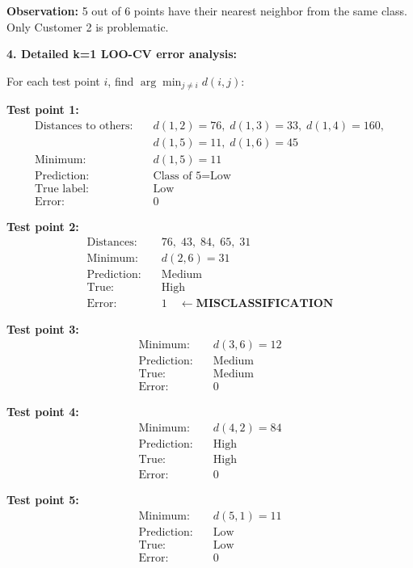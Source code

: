 \documentclass[12pt]{article}
\begin{document}
\begin{computation}
\textbf{Observation:} 5 out of 6 points have their nearest neighbor from the same class. Only Customer 2 is problematic.

\textbf{4. Detailed k=1 LOO-CV error analysis:}

For each test point \(i\), find \(\arg\min_{j \neq i} d(i,j)\):

\textbf{Test point 1:}
\begin{align*}
\text{Distances to others:} &\quad d(1,2)=76, \; d(1,3)=33, \; d(1,4)=160, \\
&\quad d(1,5)=11, \; d(1,6)=45 \\
\text{Minimum:} &\quad d(1,5) = 11 \\
\text{Prediction:} &\quad \text{Class of 5} = \text{Low} \\
\text{True label:} &\quad \text{Low} \\
\text{Error:} &\quad 0
\end{align*}

\textbf{Test point 2:}
\begin{align*}
\text{Distances:} &\quad 76, \; 43, \; 84, \; 65, \; 31 \\
\text{Minimum:} &\quad d(2,6) = 31 \\
\text{Prediction:} &\quad \text{Medium} \\
\text{True:} &\quad \text{High} \\
\text{Error:} &\quad 1 \quad \leftarrow \textbf{MISCLASSIFICATION}
\end{align*}

\textbf{Test point 3:}
\begin{align*}
\text{Minimum:} &\quad d(3,6) = 12 \\
\text{Prediction:} &\quad \text{Medium} \\
\text{True:} &\quad \text{Medium} \\
\text{Error:} &\quad 0
\end{align*}

\textbf{Test point 4:}
\begin{align*}
\text{Minimum:} &\quad d(4,2) = 84 \\
\text{Prediction:} &\quad \text{High} \\
\text{True:} &\quad \text{High} \\
\text{Error:} &\quad 0
\end{align*}

\textbf{Test point 5:}
\begin{align*}
\text{Minimum:} &\quad d(5,1) = 11 \\
\text{Prediction:} &\quad \text{Low} \\
\text{True:} &\quad \text{Low} \\
\text{Error:} &\quad 0
\end{align*}


\end{computation}
\end{document}
